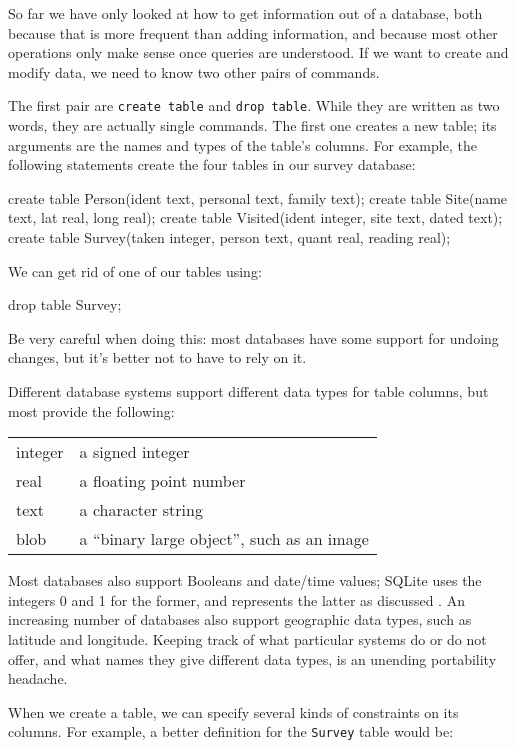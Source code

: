 \documentclass{book}
\begin{document}
So far we have only looked at how to get information out of a database,
both because that is more frequent than adding information, and because
most other operations only make sense once queries are understood. If we
want to create and modify data, we need to know two other pairs of
commands.

The first pair are \texttt{create table} and \texttt{drop table}. While
they are written as two words, they are actually single commands. The
first one creates a new table; its arguments are the names and types of
the table's columns. For example, the following statements create the
four tables in our survey database:

\begin{VerbIn}
create table Person(ident text, personal text, family text);
create table Site(name text, lat real, long real);
create table Visited(ident integer, site text, dated text);
create table Survey(taken integer, person text, quant real, reading real);
\end{VerbIn}

We can get rid of one of our tables using:

\begin{VerbIn}
drop table Survey;
\end{VerbIn}

Be very careful when doing this: most databases have some support for
undoing changes, but it's better not to have to rely on it.

Different database systems support different data types for table
columns, but most provide the following:

\begin{tabular}{ll}
integer & a signed integer \\
real & a floating point number \\
text & a character string \\
blob & a ``binary large object'', such as an image \\
\end{tabular}

Most databases also support Booleans and date/time values; SQLite uses
the integers 0 and 1 for the former, and represents the latter as
discussed . An increasing number of databases
also support geographic data types, such as latitude and longitude.
Keeping track of what particular systems do or do not offer, and what
names they give different data types, is an unending portability
headache.

When we create a table, we can specify several kinds of constraints on
its columns. For example, a better definition for the \texttt{Survey}
table would be:
\end{document}
